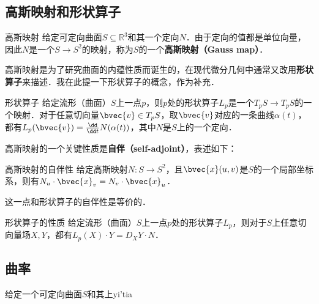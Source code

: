 
\subsection{高斯映射和形状算子}
\begin{definition}{高斯映射}
给定可定向曲面$S\subseteq\mathbb{R}^3$和其一个定向$N$．由于定向的值都是单位向量，因此$N$是一个$S\to S^2$的映射，称为$S$的一个\textbf{高斯映射（Gauss map）}．
\end{definition}

高斯映射是为了研究曲面的内蕴性质而诞生的，在现代微分几何中通常又改用\textbf{形状算子}来描述．我在此提一下形状算子的概念，作为补充．

\begin{definition}{形状算子}
给定流形（曲面）$S$上一点$p$，则$p$处的形状算子$L_p$是一个$T_pS\to T_pS$的一个映射．对于任意切向量$\bvec{v}\in T_pS$，取$\bvec{v}$对应的一条曲线$\alpha(t)$，都有$L_p(\bvec{v})=\frac{\dd}{\dd t}N(\alpha(t))$，其中$N$是$S$上的一个定向．
\end{definition}


高斯映射的一个关键性质是\textbf{自伴（self-adjoint）}，表述如下：

\begin{theorem}{高斯映射的自伴性}
给定高斯映射$N:S\to S^2$，且$\bvec{x}(u, v)$是$S$的一个局部坐标系，则有$N_u\cdot \bvec{x}_v=N_v\cdot \bvec{x}_u$．
\end{theorem}

这一点和形状算子的自伴性是等价的．

\begin{theorem}{形状算子的性质}
给定流形（曲面）$S$上一点$p$处的形状算子$L_p$，则对于$S$上任意切向量场$X, Y$，都有$L_p(X)\cdot Y=D_XY\cdot N$．
\end{theorem}

\subsection{曲率}

\begin{definition}{}
给定一个可定向曲面$S$和其上yi'tia
\end{definition}




